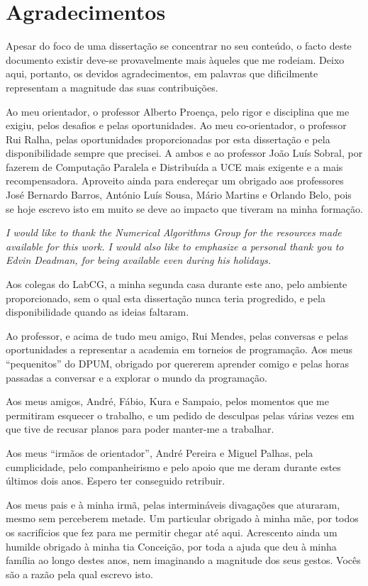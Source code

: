 \documentclass[../extabst]{subfiles}
\begin{document}
	\chapter*{Agradecimentos}
	Apesar do foco de uma dissertação se concentrar no seu conteúdo, o facto deste documento existir deve-se provavelmente mais àqueles que me rodeiam. Deixo aqui, portanto, os devidos agradecimentos, em palavras que dificilmente representam a magnitude das suas contribuições.

	Ao meu orientador, o professor Alberto Proença, pelo rigor e disciplina que me exigiu, pelos desafios e pelas oportunidades. Ao meu co-orientador, o professor Rui Ralha, pelas oportunidades proporcionadas por esta dissertação e pela disponibilidade sempre que precisei. A ambos e ao professor João Luís Sobral, por fazerem de Computação Paralela e Distribuída a UCE mais exigente e a mais recompensadora. Aproveito ainda para endereçar um obrigado aos professores José Bernardo Barros, António Luís Sousa, Mário Martins e Orlando Belo, pois se hoje escrevo isto em muito se deve ao impacto que tiveram na minha formação.

	{\itshape
	I would like to thank the Numerical Algorithms Group for the resources made available for this work. I would also like to emphasize a personal thank you to Edvin Deadman, for being available even during his holidays.
	}

	Aos colegas do LabCG, a minha segunda casa durante este ano, pelo ambiente proporcionado, sem o qual esta dissertação nunca teria progredido, e pela disponibilidade quando as ideias faltaram.

	Ao professor, e acima de tudo meu amigo, Rui Mendes, pelas conversas e pelas oportunidades a representar a academia em torneios de programação. Aos meus ``pequenitos'' do DPUM, obrigado por quererem aprender comigo e pelas horas passadas a conversar e a explorar o mundo da programação.

	Aos meus amigos, André, Fábio, Kura e Sampaio, pelos momentos que me permitiram esquecer o trabalho, e um pedido de desculpas pelas várias vezes em que tive de recusar planos para poder manter-me a trabalhar.

	Aos meus ``irmãos de orientador'', André Pereira e Miguel Palhas, pela cumplicidade, pelo companheirismo e pelo apoio que me deram durante estes últimos dois anos. Espero ter conseguido retribuir.

	Aos meus pais e à minha irmã, pelas intermináveis divagações que aturaram, mesmo sem perceberem metade. Um particular obrigado à minha mãe, por todos os sacrifícios que fez para me permitir chegar até aqui. Acrescento ainda um humilde obrigado à minha tia Conceição, por toda a ajuda que deu à minha família ao longo destes anos, nem imaginando a magnitude dos seus gestos. Vocês são a razão pela qual escrevo isto.
\end{document}
